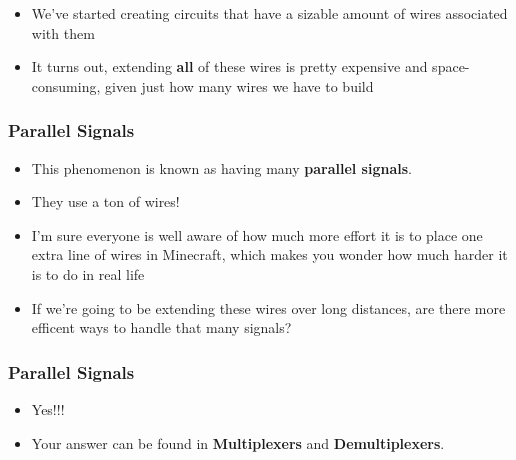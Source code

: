 \documentclass{beamer}
\begin{document}
\begin{frame}


			\begin{itemize}
				\item We've started creating circuits that have a sizable amount of wires associated with them
				\item It turns out, extending \textbf{all} of these wires is pretty expensive and space-consuming, given just how many wires we have to build
			\end{itemize}
			
			
			

		\end{frame}	
		
		
		\begin{frame}
			\frametitle{Parallel Signals}
			\begin{itemize}
				\item This phenomenon is known as having many \textbf{parallel signals}.
				\item They use a ton of wires!
				\item I'm sure everyone is well aware of how much more effort it is to place one extra line of wires in Minecraft, which makes you wonder how much harder it is to do in real life
				\item If we're going to be extending these wires over long distances, are there more efficent ways to handle that many signals?
			\end{itemize}
		\end{frame}	
		
		\begin{frame}
			\frametitle{Parallel Signals}
			\begin{itemize}
				\item Yes!!!
				\item Your answer can be found in \textbf{Multiplexers} and \textbf{Demultiplexers}.
			\end{itemize}
		\end{frame}			  	        
        
\end{document}
